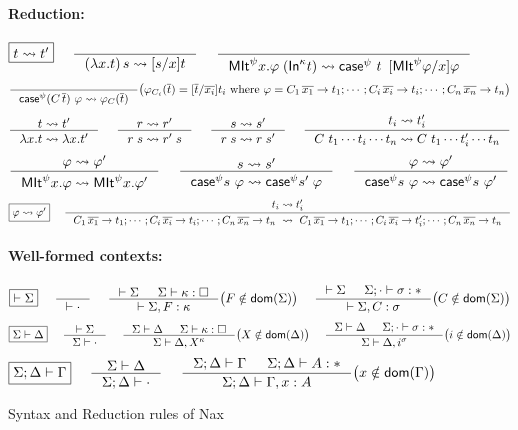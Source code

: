 \begin{figure}
\begin{framed}
\paragraph{Reduction:}
\[ \fbox{$t \rightsquigarrow t'$}
 ~~~~
   \inference{}{(\lambda x.t)\,s \rightsquigarrow [s/x]t}
 ~~~~
   \inference{}
      { \MIt^\psi x.\varphi\;(\In^\kappa t) \rightsquigarrow
        \case^\psi~t~\, [\MIt^\psi \varphi/x]\varphi }
\]
\[ \inference{}
             { \case^\psi (C\,\overline{t}) ~ \varphi \rightsquigarrow
               \varphi_{C}(\overline{t}) }
      \big( \varphi_{C_i}(\overline{t}) = [\overline{t}/\overline{x_i}]t_i
           ~\text{where}~ \varphi = C_1\,\overline{x_1} -> t_1;\cdots;
                                    C_i\,\overline{x_i} -> t_i;\cdots;
                                    C_n\,\overline{x_n} -> t_n \big)
\]
\[  \inference{t \rightsquigarrow t'}{\lambda x.t \rightsquigarrow \lambda x.t'}
 ~~~~
   \inference{r \rightsquigarrow r'}{r\;s \rightsquigarrow r'\;s}
 ~~~~
   \inference{s \rightsquigarrow s'}{r\;s \rightsquigarrow r\;s'}
 ~~~~
   \inference{t_i \rightsquigarrow t_i'}
             {C~t_1\cdots t_i \cdots t_n \rightsquigarrow
              C~t_1\cdots t_i'\cdots t_n }
\]
\[ \inference{\varphi \rightsquigarrow \varphi'}
             {\MIt^\psi x.\varphi \rightsquigarrow \MIt^\psi x.\varphi'}
 ~~~~
   \inference{s \rightsquigarrow s'}
             {\case^\psi s ~\varphi \rightsquigarrow \case^\psi s'\;\varphi }
 ~~~~
   \inference{\varphi \rightsquigarrow \varphi'}
             {\case^\psi s ~\varphi \rightsquigarrow \case^\psi s ~\varphi'}
\]
\[ \fbox{$\varphi \rightsquigarrow \varphi'$}
 ~~~~
   \inference{t_i \rightsquigarrow t_i'}
      { C_1\,\overline{x_1} -> t_1;\cdots
       ;C_i\,\overline{x_i} -> t_i;\cdots
       ;C_n\,\overline{x_n} -> t_n
      ~\rightsquigarrow~
        C_1\,\overline{x_1} -> t_1;\cdots
       ;C_i\,\overline{x_i} -> t_i';\cdots
       ;C_n\,\overline{x_n} -> t_n
      }
\]

\paragraph{Well-formed contexts:}
\[ \fbox{$|- \Sigma$}
 ~~~~
   \inference{}{|- \cdot}
 ~~~~
   \inference{|- \Sigma & \Sigma |- \kappa:\square}
             {|- \Sigma,F:\kappa}
      \big( F\notin\dom(\Sigma) \big)
 ~~~~
   \inference{|- \Sigma & \Sigma;\cdot |- \sigma:*}
             {|- \Sigma,C:\sigma}
      \big( C\notin\dom(\Sigma) \big)
\]
\[ \fbox{$\Sigma|- \Delta$}
 ~~~~
   \inference{|- \Sigma}{\Sigma |- \cdot}
 ~~~~
   \inference{\Sigma |- \Delta & \Sigma |- \kappa:\square}
             {\Sigma |- \Delta,X^\kappa}
      \big( X\notin\dom(\Delta) \big)
 ~~~~ 
   \inference{\Sigma |- \Delta & \Sigma;\cdot |- \sigma:*}
             {\Sigma |- \Delta,i^\sigma}
      \big( i\notin\dom(\Delta) \big)
\]
\[ \fbox{$\Sigma;\Delta |- \Gamma$}
 ~~~~
   \inference{\Sigma |- \Delta}{\Sigma;\Delta |- \cdot}
 ~~~~
   \inference{\Sigma;\Delta |- \Gamma & \Sigma;\Delta |- A:*}
             {\Sigma;\Delta |- \Gamma,x:A}
      \big( x\notin\dom(\Gamma) \big)
\]
\end{framed}
\caption{Syntax and Reduction rules of Nax}
\label{fig:NaxSyntax}
\end{figure}

